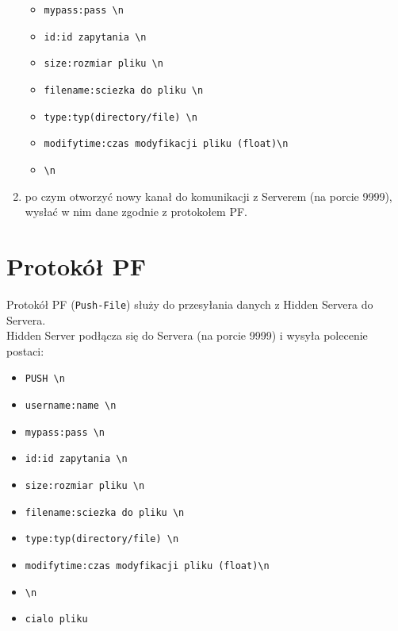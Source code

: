 \documentclass[a4paper,notitlepage]{article}
\begin{document}
\begin{enumerate}
\begin{itemize}
        \item \texttt{mypass:pass \textbackslash n}
        \item \texttt{id:id zapytania \textbackslash n}
        \item \texttt{size:rozmiar pliku \textbackslash n}
        \item \texttt{filename:sciezka do pliku \textbackslash n}
        \item \texttt{type:typ(directory/file) \textbackslash n}
        \item \texttt{modifytime:czas modyfikacji pliku (float)\textbackslash n}
        \item \texttt{\textbackslash n}
    \end{itemize}
    \item po czym otworzyć nowy kanał do komunikacji z Serverem (na porcie 9999), wysłać w nim dane zgodnie z protokołem PF.
\end{enumerate}
\section{Protokół PF}
Protokół PF (\texttt{Push-File}) służy do przesyłania danych z Hidden Servera do Servera. \\
Hidden Server podłącza się do Servera (na porcie 9999) i wysyła polecenie postaci:
\begin{itemize}
        \item \texttt{PUSH \textbackslash n}
        \item \texttt{username:name \textbackslash n}
        \item \texttt{mypass:pass \textbackslash n}
        \item \texttt{id:id zapytania \textbackslash n}
        \item \texttt{size:rozmiar pliku \textbackslash n}
        \item \texttt{filename:sciezka do pliku \textbackslash n}
        \item \texttt{type:typ(directory/file) \textbackslash n}
        \item \texttt{modifytime:czas modyfikacji pliku (float)\textbackslash n}
        \item \texttt{\textbackslash n}
        \item \texttt{cialo pliku}
    \end{itemize}
\end{document}

